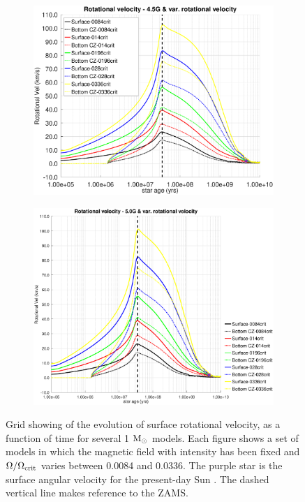 \documentclass[fleqn,usenatbib]{mnras}
\begin{document}
\begin{figure}
\begin{subfigure}[h]{0.47\textwidth}
    \includegraphics[trim = 10mm 10mm 15mm 10mm, clip,width=\textwidth]{figures/rot_vel_var_vel_4_5g.eps}
    \label{fig:subim45}
    \end{subfigure}
    \begin{subfigure}[h]{0.47\textwidth}
    \includegraphics[trim = 10mm 10mm 15mm 10mm, clip,width=\textwidth]{figures/rot_vel_var_vel_5_0g.eps}
    \label{fig:subim46}
    \end{subfigure}
\caption{Grid showing of the evolution of surface rotational velocity, as a function of time for several 1 $\mathrm{M}_\odot$ models. Each figure shows a set of models in which the magnetic field with intensity has been fixed and $\Omega / \Omega_{\mathrm{crit}}$ varies between 0.0084 and 0.0336. The purple star is the surface angular velocity for the present-day Sun \citep{Gill2012}. The dashed vertical line makes reference to the ZAMS.}
\label{fig:grid_rot_vel}
\end{figure}




\bsp	%
\label{lastpage}
\end{document}
